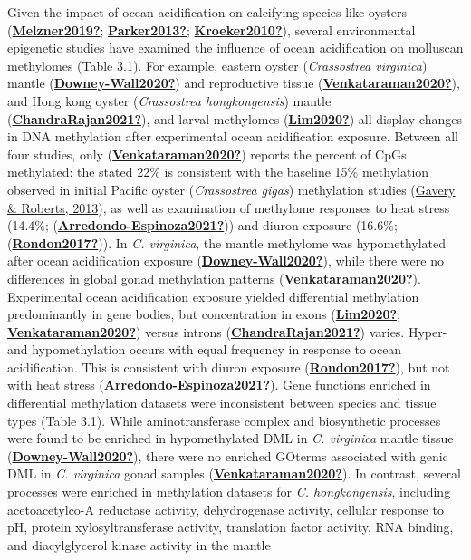 \documentclass [11pt, proquest] {uwthesis}[2015/03/03]
\begin{document}
Given the impact of ocean acidification on calcifying species like oysters (\protect\hyperlink{ref-Melzner2019}{\textbf{Melzner2019?}}; \protect\hyperlink{ref-Parker2013}{\textbf{Parker2013?}}; \protect\hyperlink{ref-Kroeker2010}{\textbf{Kroeker2010?}}), several environmental epigenetic studies have examined the influence of ocean acidification on molluscan methylomes (Table 3.1). For example, eastern oyster (\emph{Crassostrea virginica}) mantle (\protect\hyperlink{ref-Downey-Wall2020}{\textbf{Downey-Wall2020?}}) and reproductive tissue (\protect\hyperlink{ref-Venkataraman2020}{\textbf{Venkataraman2020?}}), and Hong kong oyster (\emph{Crassostrea hongkongensis}) mantle (\protect\hyperlink{ref-ChandraRajan2021}{\textbf{ChandraRajan2021?}}), and larval methylomes (\protect\hyperlink{ref-Lim2020}{\textbf{Lim2020?}}) all display changes in DNA methylation after experimental ocean acidification exposure. Between all four studies, only (\protect\hyperlink{ref-Venkataraman2020}{\textbf{Venkataraman2020?}}) reports the percent of CpGs methylated: the stated 22\% is consistent with the baseline 15\% methylation observed in initial Pacific oyster (\emph{Crassostrea gigas}) methylation studies (\protect\hyperlink{ref-Gavery2013}{Gavery \& Roberts, 2013}), as well as examination of methylome responses to heat stress (14.4\%; (\protect\hyperlink{ref-Arredondo-Espinoza2021}{\textbf{Arredondo-Espinoza2021?}})) and diuron exposure (16.6\%; (\protect\hyperlink{ref-Rondon2017}{\textbf{Rondon2017?}})). In \emph{C. virginica}, the mantle methylome was hypomethylated after ocean acidification exposure (\protect\hyperlink{ref-Downey-Wall2020}{\textbf{Downey-Wall2020?}}), while there were no differences in global gonad methylation patterns (\protect\hyperlink{ref-Venkataraman2020}{\textbf{Venkataraman2020?}}). Experimental ocean acidification exposure yielded differential methylation predominantly in gene bodies, but concentration in exons (\protect\hyperlink{ref-Lim2020}{\textbf{Lim2020?}}; \protect\hyperlink{ref-Venkataraman2020}{\textbf{Venkataraman2020?}}) versus introns (\protect\hyperlink{ref-ChandraRajan2021}{\textbf{ChandraRajan2021?}}) varies. Hyper- and hypomethylation occurs with equal frequency in response to ocean acidification. This is consistent with diuron exposure (\protect\hyperlink{ref-Rondon2017}{\textbf{Rondon2017?}}), but not with heat stress (\protect\hyperlink{ref-Arredondo-Espinoza2021}{\textbf{Arredondo-Espinoza2021?}}). Gene functions enriched in differential methylation datasets were inconsistent between species and tissue types (Table 3.1). While aminotransferase complex and biosynthetic processes were found to be enriched in hypomethylated DML in \emph{C. virginica} mantle tissue (\protect\hyperlink{ref-Downey-Wall2020}{\textbf{Downey-Wall2020?}}), there were no enriched GOterms associated with genic DML in \emph{C. virginica} gonad samples (\protect\hyperlink{ref-Venkataraman2020}{\textbf{Venkataraman2020?}}). In contrast, several processes were enriched in methylation datasets for \emph{C. hongkongensis}, including acetoacetylco-A reductase activity, dehydrogenase activity, cellular response to pH, protein xylosyltransferase activity, translation factor activity, RNA binding, and diacylglycerol kinase activity in the mantle 
\end{document}

